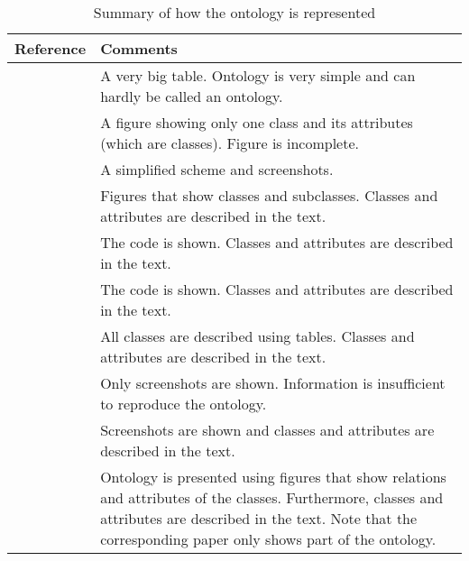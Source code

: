 \documentclass[10pt,final,a4paper,oneside,onecolumn]{article}
\newcommand{\otoprule}{\midrule[\heavyrulewidth]}
\begin{document}
\begin{table}[b]
	\caption{Summary of how the ontology is represented}
	\label{tbl:ontology papers}
	\begin{tabularx}{\linewidth}{l X}
		\toprule
		Reference & Comments \\ \otoprule
		\cite{jones2011international} & A very big table. Ontology is very simple and can hardly be called an ontology. \\
		\cite{geyer2014} & A figure showing only one class and its attributes (which are classes). Figure is incomplete. \\
		\cite{gkoutos2004mouse} & A simplified scheme and screenshots. \\
		\cite{kim2005security} & Figures that show classes and subclasses. Classes and attributes are described in the text. \\
		\cite{chen2004soupa} & The code is shown. Classes and attributes are described in the text. \\
		\cite{chen2003ontology} & The code is shown. Classes and attributes are described in the text. \\
		\cite{golemati2007creating} & All classes are described using tables. Classes and attributes are described in the text. \\
		\cite{lee2017location} & Only screenshots are shown. Information is insufficient to reproduce the ontology. \\
		\cite{matsokis2010plm} & Screenshots are shown and classes and attributes are described in the text. \\
		\cite{vanDamPhDThesis2009} & Ontology is presented using figures that show relations and attributes of the classes. Furthermore, classes and attributes are described in the text. Note that the corresponding paper \cite{vanDam2010model} only shows part of the ontology. \\
		\bottomrule
	\end{tabularx}
\end{table}
\end{document}
